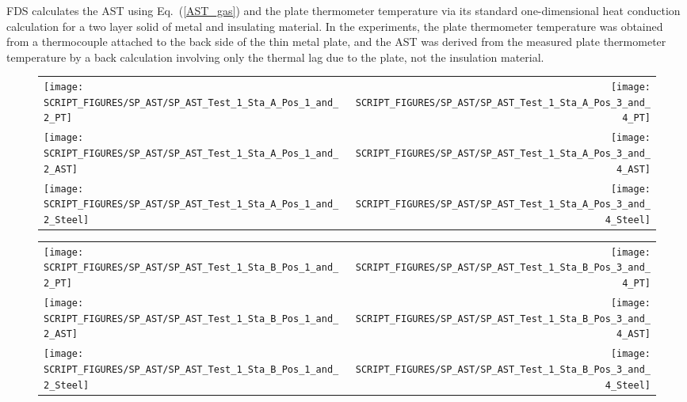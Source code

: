 FDS calculates the AST using Eq.~(\ref{AST_gas}) and the plate thermometer temperature via its standard one-dimensional heat conduction calculation for a
two layer solid of metal and insulating material. In the experiments, the plate thermometer temperature was obtained from a thermocouple attached to the back side of
the thin metal plate, and the AST was derived from the measured plate thermometer temperature by a back calculation involving only the thermal lag due to the
plate, not the insulation material.

\newpage


\begin{figure}[p]
\begin{tabular*}{\textwidth}{l@{\extracolsep{\fill}}r}
\texttt{[image: SCRIPT\_FIGURES/SP\_AST/SP\_AST\_Test\_1\_Sta\_A\_Pos\_1\_and\_2\_PT]} &
\texttt{[image: SCRIPT\_FIGURES/SP\_AST/SP\_AST\_Test\_1\_Sta\_A\_Pos\_3\_and\_4\_PT]} \\
\texttt{[image: SCRIPT\_FIGURES/SP\_AST/SP\_AST\_Test\_1\_Sta\_A\_Pos\_1\_and\_2\_AST]} &
\texttt{[image: SCRIPT\_FIGURES/SP\_AST/SP\_AST\_Test\_1\_Sta\_A\_Pos\_3\_and\_4\_AST]} \\
\texttt{[image: SCRIPT\_FIGURES/SP\_AST/SP\_AST\_Test\_1\_Sta\_A\_Pos\_1\_and\_2\_Steel]} &
\texttt{[image: SCRIPT\_FIGURES/SP\_AST/SP\_AST\_Test\_1\_Sta\_A\_Pos\_3\_and\_4\_Steel]}
\end{tabular*}
\label{SP_Test_1_Station_A}
\end{figure}

\begin{figure}[p]
\begin{tabular*}{\textwidth}{l@{\extracolsep{\fill}}r}
\texttt{[image: SCRIPT\_FIGURES/SP\_AST/SP\_AST\_Test\_1\_Sta\_B\_Pos\_1\_and\_2\_PT]} &
\texttt{[image: SCRIPT\_FIGURES/SP\_AST/SP\_AST\_Test\_1\_Sta\_B\_Pos\_3\_and\_4\_PT]} \\
\texttt{[image: SCRIPT\_FIGURES/SP\_AST/SP\_AST\_Test\_1\_Sta\_B\_Pos\_1\_and\_2\_AST]} &
\texttt{[image: SCRIPT\_FIGURES/SP\_AST/SP\_AST\_Test\_1\_Sta\_B\_Pos\_3\_and\_4\_AST]} \\
\texttt{[image: SCRIPT\_FIGURES/SP\_AST/SP\_AST\_Test\_1\_Sta\_B\_Pos\_1\_and\_2\_Steel]} &
\texttt{[image: SCRIPT\_FIGURES/SP\_AST/SP\_AST\_Test\_1\_Sta\_B\_Pos\_3\_and\_4\_Steel]}
\end{tabular*}
\label{SP_Test_1_Station_B}
\end{figure}

